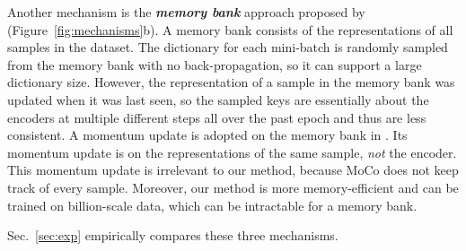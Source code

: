 \documentclass[10pt,twocolumn,letterpaper]{article}
\begin{document}
Another mechanism is the \textbf{\emph{memory bank}} approach proposed by \cite{Wu2018a} (Figure~\ref{fig:mechanisms}b). A memory bank consists of the representations of all samples in the dataset. The dictionary for each mini-batch is randomly sampled from the memory bank with no back-propagation, so it can support a large dictionary size. However, the representation of a sample in the memory bank was updated when it was last seen, so the sampled keys are essentially about the encoders at \mbox{multiple} \mbox{different} steps all over the past epoch and thus are less consistent. 
A momentum update is adopted on the memory bank in \cite{Wu2018a}. Its momentum update is on the representations of the same sample, \emph{not} the \mbox{encoder}. This momentum update is \mbox{irrelevant} to our method, because MoCo does not keep track of every sample. Moreover, our method is more memory-efficient and can be trained on billion-scale data, which can be intractable for a memory bank.

Sec.~\ref{sec:exp} empirically compares these three mechanisms.
\end{document}
